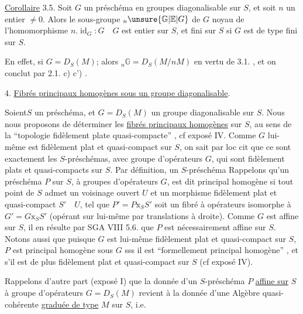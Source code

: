 \uline{Corollaire} 3.5. Soit $G$ un  préschéma en groupes diagonalisable
sur $S$, et soit $n$ un entier $\ne0$. Alors le sous-groupe $ {}_n\unsure{\mathbb G|\mathbb E|G}$ de $G$ noyau
de l'homomorphisme $n.\operatorname{id}_G:G\quad G$ est entier sur $S$, et fini sur
$S$ si $G$ est de type fini sur $S$.

En effet, si $G=D_S(M)$; alors $ {}_n\mathbb G=D_S(M/nM)$ en vertu de 3.1. , et
on conclut par 2.1. c) c') .

4. \uline{Fibrés principaux homogènes sous un groupe diagonalisable}.

Soient$S$ un préschéma, et $G=D_S(M)$ un groupe diagonalisable sur $S$.
Nous nous proposons de déterminer les \uline{fibrés principaux homogènes} sur
$S$, au sens de la ``topologie fidèlement plate quasi-compacte'' , cf
exposé IV. Comme $G$ lui-même est fidèlement plat et quasi-compact sur
$S$, on sait par loc cit que ce sont exactement les $S$-préschémas, 
avec groupe d'opérateurs $G$,  qui sont fidèlement plats et quasi-compacts sur $S$. Par définition, un $S$-préschéma \quad Rappelons qu'un
préschéma $P$ sur $S$, à groupes d'opérateurs $G$, est dit principal homogène
si tout point de $S$ admet un voisinage ouvert $U$ et un morphisme fidèlement plat et quasi-compact $S'\quad U$, tel que $P'=P\mathbin{\mathrm{x}}_S S'$ soit un fibré
à opérateurs isomorphe à $G'=G\mathbin{\mathrm{x}}_S S'$ (opérant sur lui-même par translations à droite). Comme $G$ est affine sur $S$, il en résulte par SGA
VIII 5.6. que $P$ est nécessairement affine sur $S$. Notons aussi
que puisque $G$ est lui-même fidèlement plat et quasi-compact sur $S$, $P$
est principal homogène sous $G$ sss il est ``formellement principal
homogène'' , et s'il est de plus fidèlement plat et quasi-compact sur $S$
(cf exposé IV).

Rappelons d'autre part (exposé I) que la donnée d'un $S$-préschéma $P$ \uline{affine sur} $S$ à groupe d'opérateurs $G=D_S(M)$ revient à la donnée d'une Algèbre quasi-cohérente \uline{graduée de type} $M$ sur $S$, i.e.
